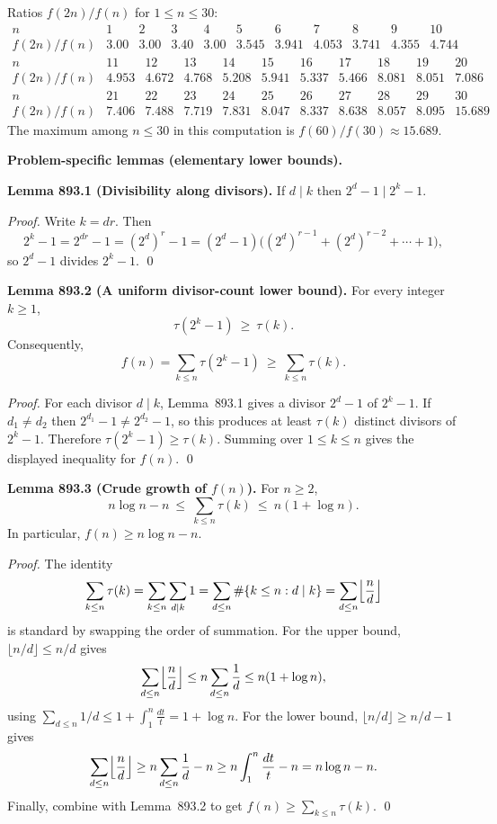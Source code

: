 Ratios $f(2n)/f(n)$ for $1\le n\le 30$:
\[
\begin{array}{c|cccccccccc}
 n&1&2&3&4&5&6&7&8&9&10\\\hline
 f(2n)/f(n)&3.00&3.00&3.40&3.00&3.545&3.941&4.053&3.741&4.355&4.744
\end{array}
\]
\[
\begin{array}{c|cccccccccc}
 n&11&12&13&14&15&16&17&18&19&20\\\hline
 f(2n)/f(n)&4.953&4.672&4.768&5.208&5.941&5.337&5.466&8.081&8.051&7.086
\end{array}
\]
\[
\begin{array}{c|cccccccccc}
 n&21&22&23&24&25&26&27&28&29&30\\\hline
 f(2n)/f(n)&7.406&7.488&7.719&7.831&8.047&8.337&8.638&8.057&8.095&15.689
\end{array}
\]
The maximum among $n\le 30$ in this computation is $f(60)/f(30)\approx 15.689$.

\medskip
\textbf{Problem-specific lemmas (elementary lower bounds).}

\medskip
\noindent\textbf{Lemma 893.1 (Divisibility along divisors).}
If $d\mid k$ then $2^d-1\mid 2^k-1$.

\emph{Proof.}
Write $k=dr$. Then
\[
2^k-1 = 2^{dr}-1 = (2^d)^r-1 = (2^d-1)\bigl((2^d)^{r-1}+(2^d)^{r-2}+\cdots+1\bigr),
\]
so $2^d-1$ divides $2^k-1$.
\qed

\medskip
\noindent\textbf{Lemma 893.2 (A uniform divisor-count lower bound).}
For every integer $k\ge 1$,
\[ \tau(2^k-1)\ \ge\ \tau(k). \]
Consequently,
\[ f(n)=\sum_{k\le n}\tau(2^k-1)\ \ge\ \sum_{k\le n}\tau(k). \]

\emph{Proof.}
For each divisor $d\mid k$, Lemma~893.1 gives a divisor $2^d-1$ of $2^k-1$.
If $d_1\ne d_2$ then $2^{d_1}-1\ne 2^{d_2}-1$, so this produces at least $\tau(k)$
distinct divisors of $2^k-1$. Therefore $\tau(2^k-1)\ge \tau(k)$.
Summing over $1\le k\le n$ gives the displayed inequality for $f(n)$.
\qed

\medskip
\noindent\textbf{Lemma 893.3 (Crude growth of $f(n)$).}
For $n\ge 2$,
\[ n\log n - n\ \le\ \sum_{k\le n}\tau(k)\ \le\ n(1+\log n). \]
In particular, $f(n)\ge n\log n - n$.

\emph{Proof.}
The identity
\[ \sum_{k\le n}\tau(k) = \sum_{k\le n}\sum_{d\mid k} 1 = \sum_{d\le n}\#\{k\le n: d\mid k\}
= \sum_{d\le n} \Bigl\lfloor\frac{n}{d}\Bigr\rfloor
\]
is standard by swapping the order of summation.
For the upper bound, $\lfloor n/d\rfloor\le n/d$ gives
\[ \sum_{d\le n}\Bigl\lfloor\frac{n}{d}\Bigr\rfloor \le n\sum_{d\le n}\frac{1}{d}
\le n(1+\log n), \]
using $\sum_{d\le n}1/d \le 1+\int_1^n \frac{dt}{t}=1+\log n$.
For the lower bound, $\lfloor n/d\rfloor\ge n/d -1$ gives
\[ \sum_{d\le n}\Bigl\lfloor\frac{n}{d}\Bigr\rfloor \ge n\sum_{d\le n}\frac{1}{d}-n
\ge n\int_1^n \frac{dt}{t} - n = n\log n - n.
\]
Finally, combine with Lemma~893.2 to get $f(n)\ge \sum_{k\le n}\tau(k)$.
\qed

